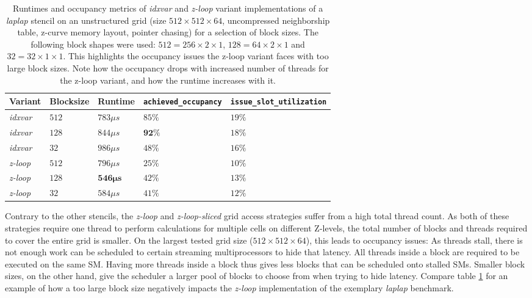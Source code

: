 \begin{table}
	\begin{tabular}{l l l p{2.5cm} p{2.5cm}}
		\hline
		\textbf{Variant} & \textbf{Blocksize} & \textbf{Runtime} & \textbf{\texttt{achieved\_\allowbreak occupancy}} & \textbf{\texttt{issue\_\allowbreak slot\_\allowbreak utilization}} \\
		\hline
		\hline
		\emph{idxvar} & $512$ & $783\mu s$ & $85\%$ & $19\%$ \\
		\emph{idxvar} & $128$ & $844\mu s$ & $\mathbf{92\%}$ & $18\%$ \\
		\emph{idxvar} & $32$  & $986\mu s$ & $48\%$ & $16\%$ \\
		\emph{z-loop} & $512$ & $796\mu s$ & $25\%$ & $10\%$\\
		\emph{z-loop} & $128$ & $\mathbf{546\mu s}$ & $42\%$ & $13\%$ \\ 
		\emph{z-loop} & $32$  & $584\mu s$ & $41\%$ & $12\%$ \\
		\hline
	\end{tabular}
	\caption{\label{tab:laplap-blocksize-occupancy} Runtimes and occupancy metrics of \emph{idxvar} and \emph{z-loop} variant implementations of a \emph{laplap} stencil on an unstructured grid (size $512\times 512\times 64$, uncompressed neighborship table, z-curve memory layout, pointer chasing) for a selection of block sizes. The following block shapes were used: $512 = 256\times 2\times 1$, $128 = 64\times 2\times 1$ and $32 = 32\times 1 \times 1$. This highlights the occupancy issues the z-loop variant faces with too large block sizes. Note how the occupancy drops with increased number of threads for the z-loop variant, and how the runtime increases with it.}
\end{table}

Contrary to the other stencils, the \emph{z-loop} and \emph{z-loop-sliced} grid access strategies suffer from a high total thread count. As both of these strategies require one thread to perform calculations for multiple cells on different Z-levels, the total number of blocks and threads required to cover the entire grid is smaller. On the largest tested grid size ($512\times 512\times 64$), this leads to occupancy issues: As threads stall, there is not enough work can be scheduled to certain streaming multiprocessors to hide that latency. All threads inside a block are required to be executed on the same SM. Having more threads inside a block thus gives less blocks that can be scheduled onto stalled SMs. Smaller block sizes, on the other hand, give the scheduler a larger pool of blocks to choose from when trying to hide latency. Compare table \ref{tab:laplap-blocksize-occupancy} for an example of how a too large block size negatively impacts the \emph{z-loop} implementation of the exemplary \emph{laplap} benchmark.